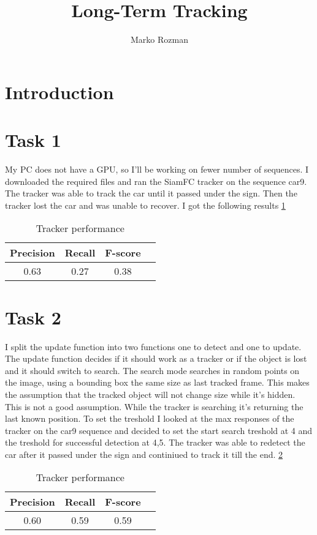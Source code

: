 \documentclass[9pt]{IEEEtran}
\title{\vspace{0ex}Long-Term Tracking}
\author{Marko Rozman\vspace{-4.0ex}}
\begin{document}
\maketitle

\section{Introduction}


\section{Task 1}
My PC does not have a GPU, so I'll be working on fewer number of sequences. I downloaded the required files and ran the SiamFC tracker on the sequence car9. The tracker was able to track the car until it passed under the sign. Then the tracker lost the car and was unable to recover. I got the following results \ref{tab:results_1}

\begin{table}[H]
    \centering
    \begin{tabular}{|c|c|c|c|}
    \hline
    Precision & Recall & F-score \\
    \hline
    0.63 & 0.27 & 0.38 \\
    \hline
    \end{tabular}
    \vspace{0.5em}
    \caption{Tracker performance}
    \label{tab:results_1}
    \end{table}



\section{Task 2}
I split the update function into two functions one to detect and one to update. The update function decides if it should work as a tracker or if the object is lost and it should switch to search. The search mode searches in random points on the image, using a bounding box the same size as last tracked frame. This makes the assumption that the tracked object will not change size while it's hidden. This is not a good assumption. While the tracker is searching it's returning the last known position. To set the treshold I looked at the max responses of the tracker on the car9 sequence and decided to set the start search treshold at 4 and the treshold for successful detection at 4,5.  The tracker was able to redetect the car after it passed under the sign and continiued to track it till the end. \ref{tab:results_2}
\begin{table}[H]
    \centering
    \begin{tabular}{|c|c|c|c|}
    \hline
    Precision & Recall & F-score \\
    \hline
    0.60 & 0.59 & 0.59 \\
    \hline
    \end{tabular}
    \vspace{0.5em}
    \caption{Tracker performance}
    \label{tab:results_2}
    \end{table}  
\end{document}
